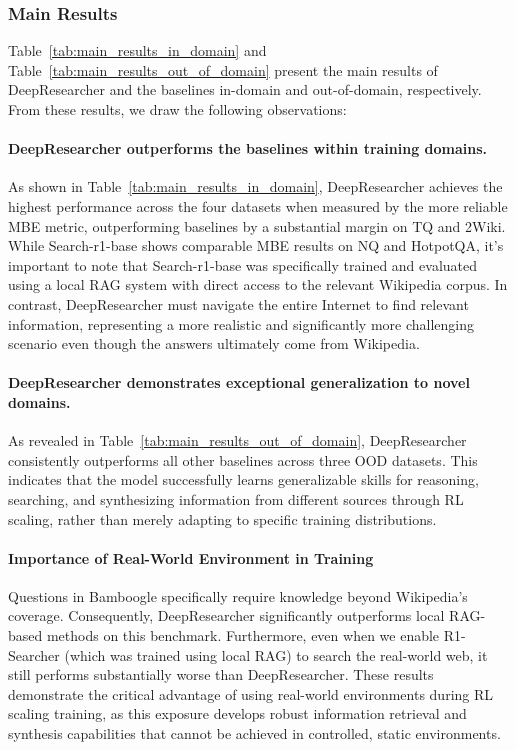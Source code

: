 \documentclass{article}
\newcommand{\scrl}{DeepResearcher\xspace}
\begin{document}
\subsubsection{Main Results}

Table~\ref{tab:main_results_in_domain} and Table~\ref{tab:main_results_out_of_domain} present the main results of \scrl and the baselines in-domain and out-of-domain, respectively. From these results, we draw the following observations:

\paragraph{\scrl outperforms the baselines within training domains.} As shown in Table~\ref{tab:main_results_in_domain}, \scrl achieves the highest performance across the four datasets when measured by the more reliable MBE metric, outperforming baselines by a substantial margin on TQ and 2Wiki. While Search-r1-base shows comparable MBE results on NQ and HotpotQA, it's important to note that Search-r1-base was specifically trained and evaluated using a local RAG system with direct access to the relevant Wikipedia corpus. In contrast, \scrl must navigate the entire Internet to find relevant information, representing a more realistic and significantly more challenging scenario even though the answers ultimately come from Wikipedia.


\paragraph{\scrl demonstrates exceptional generalization to novel domains.} As revealed in Table~\ref{tab:main_results_out_of_domain}, \scrl consistently outperforms all other baselines across three OOD datasets. This indicates that the model successfully learns generalizable skills for reasoning, searching, and synthesizing information from different sources through RL scaling, rather than merely adapting to specific training distributions.

\paragraph{Importance of Real-World Environment in Training} Questions in Bamboogle specifically require knowledge beyond Wikipedia's coverage. Consequently, \scrl significantly outperforms local RAG-based methods on this benchmark. Furthermore, even when we enable R1-Searcher (which was trained using local RAG) to search the real-world web, it still performs substantially worse than \scrl. These results demonstrate the critical advantage of using real-world environments during RL scaling training, as this exposure develops robust information retrieval and synthesis capabilities that cannot be achieved in controlled, static environments.
\end{document}
